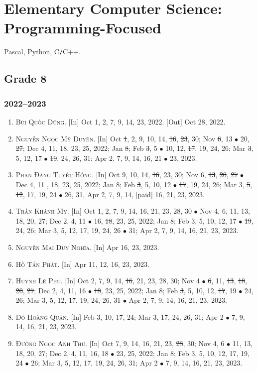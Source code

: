 \documentclass{article}
\begin{document}
\section{Elementary Computer Science: Programming-Focused}
Pascal, Python, C\texttt{/}C++.

\subsection{Grade 8}

\subsubsection{2022--2023}

\begin{enumerate}
	\item \textsc{Bùi Quốc Dũng.} \textsf{[In]} Oct 1, 2, 7, 9, 14, 23, 2022. \textsf{[Out]} Oct 28, 2022.
	\item \textsc{Nguyễn Ngọc Mỹ Duyên.} \textsf{[In]} Oct \st{1}, 2, 9, 10, 14, \st{16}, \st{23}, 30; Nov \st{6}, 13 $\bullet$ 20, \st{27}; Dec 4, 11, 18, 23, 25, 2022; Jan \st{8}; Feb \st{3}, 5 $\bullet$ 10, 12, \st{17}, 19, 24, 26; Mar \st{3}, 5, 12, 17 $\bullet$ \st{19}, 24, 26, 31; Apr 2, 7, 9, 14, 16, 21 $\bullet$ 23, 2023.
	\item \textsc{Phan Đặng Tuyết Hồng.} \textsf{[In]} Oct 9, 10, 14, \st{16}, 23, 30; Nov 6, \st{13}, \st{20}, \st{27} $\bullet$ Dec 4, 11 , 18, 23, 25, 2022; Jan 8; Feb \st{3}, 5, 10, 12 $\bullet$ \st{17}, 19, 24, 26; Mar 3, \st{5}, \st{12}, 17, 19, 24 $\bullet$ 26, 31, Apr 2, 7, 9, 14, [paid] 16, 21, 23, 2023.
	\item \textsc{Trần Khánh My.} \textsf{[In]} Oct 1, 2, 7, 9, 14, 16, 21, 23, 28, 30 $\bullet$ Nov 4, 6, 11, 13, 18, 20, 27; Dec 2, 4, 11 $\bullet$ 16, \st{18}, 23, 25, 2022; Jan 8; Feb 3, 5, 10, 12, 17 $\bullet$ \st{19}, 24, 26; Mar 3, 5, 12, 17, 19, 24, 26 $\bullet$ 31; Apr 2, 7, 9, 14, 16, 21, 23, 2023.
	\item \textsc{Nguyễn Mai Duy Nghĩa.} \textsf{[In]} Apr 16, 23, 2023.
	\item \textsc{Hồ Tấn Phát.} \textsf{[In]} Apr 11, 12, 16, 23, 2023.
	\item \textsc{Huỳnh Lê Phú.} \textsf{[In]} Oct 2, 7, 9, 14, \st{16}, 21, 23, 28, 30; Nov 4 $\bullet$ \st{6}, 11, \st{13}, \st{18}, \st{20}, \st{27}; Dec 2, 4, 11, 16 $\bullet$ \st{18}, 23, 25, 2022; Jan 8; Feb \st{3}, 5, 10, 12, \st{17}, 19 $\bullet$ 24, \st{26}; Mar 3, \st{5}, 12, 17, 19, 24, 26, \st{31} $\bullet$ Apr 2, \st{7}, 9, 14, 16, 21, 23, 2023.
	\item \textsc{Đỗ Hoàng Quân.} \textsf{[In]} Feb 3, 10, 17, 24; Mar 3, 17, 24, 26, 31; Apr 2 $\bullet$ 7, \st{9}, 14, 16, 21, 23, 2023.
	\item \textsc{Đường Ngọc Anh Thư.} \textsf{[In]} Oct 7, 9, 14, 16, 21, 23, \st{28}, 30; Nov 4, 6 $\bullet$ 11, 13, 18, 20, 27; Dec 2, 4, 11, 16, 18 $\bullet$ 23, 25, 2022; Jan 8; Feb 3, 5, 10, 12, 17, 19, 24 $\bullet$ 26; Mar 3, 5, 12, 17, 19, 24, 26, 31; Apr 2 $\bullet$ 7, 9, 14, 16, 21, 23, 2023.
\end{enumerate}
\end{document}
